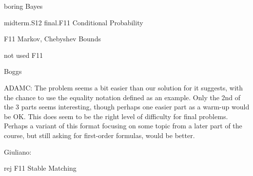 \documentclass[quiz]{mcs}
\begin{document}
\begin{editingnotes}boring Bayes\end{editingnotes}

\begin{editingnotes}midterm.S12 final.F11 Conditional Probability \end{editingnotes}
   
\begin{editingnotes}F11 Markov, Chebyshev Bounds\end{editingnotes}

\begin{editingnotes}not used F11\end{editingnotes}




\begin{editingnotes}Boggs

ADAMC: The problem seems a bit easier than our solution for it
suggests, with the chance to use the equality notation defined as an
example.  Only the 2nd of the 3 parts seems interesting, though
perhaps one easier part as a warm-up would be OK.  This does seem to
be the right level of difficulty for final problems.  Perhaps a
variant of this format focusing on some topic from a later part of the
course, but still asking for first-order formulas, would be better.
\end{editingnotes}



\begin{editingnotes}Giuliano:\end{editingnotes}



\begin{editingnotes}rej F11 Stable Matching\end{editingnotes}
\end{document}
